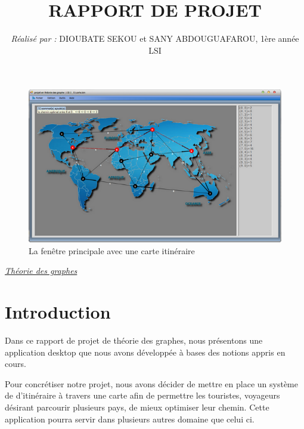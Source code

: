 \documentclass[11pt,twoside,a4paper]{article}
\title{\Huge{RAPPORT DE PROJET}}
\author{{\it Réalisé par :} DIOUBATE SEKOU et SANY ABDOUGUAFAROU, 1ère année LSI}
\begin{document}
\maketitle %
\paragraph{}
\begin{figure}[!h]
\begin{center}
\includegraphics{ecranPrincipal.png}
\caption{La fenêtre principale avec une carte itinéraire}
\end{center}
\end{figure}

\underline{{\it Théorie des graphes}}
\newpage
\tableofcontents %

\newpage
\section{Introduction}

Dans ce rapport de projet de théorie des graphes, nous présentons une application desktop que nous avons développée à bases des notions appris en cours.

Pour concrétiser notre projet, nous avons décider de mettre en place un système de d'itinéraire à travers une carte afin de permettre les touristes, voyageurs désirant parcourir plusieurs pays, de mieux optimiser leur chemin. Cette application pourra servir dans plusieurs autres domaine que celui ci.
\end{document}
